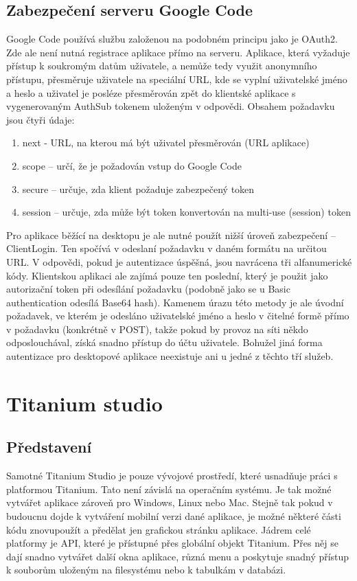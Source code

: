 \subsection{Zabezpečení serveru Google Code}

Google Code používá službu založenou na podobném principu jako je OAuth2. Zde ale není nutná registrace aplikace přímo na serveru. Aplikace, která vyžaduje přístup k soukromým datům uživatele, a nemůže tedy využit anonymního přístupu, přesměruje uživatele na speciální URL, kde se vyplní uživatelské jméno a heslo a uživatel je posléze přesměrován zpět do klientské aplikace s vygenerovaným AuthSub tokenem uloženým v odpovědi. Obsahem požadavku jsou čtyři údaje:

\begin{enumerate}
\item next - URL, na kterou má být uživatel přesměrován (URL aplikace)
\item scope – určí, že je požadován vstup do Google Code
\item secure – určuje, zda klient požaduje zabezpečený token
\item session – určuje, zda může být token konvertován na multi-use (session) token
\end{enumerate}

Pro aplikace běžící na desktopu je ale nutné použít nižší úroveň zabezpečení – ClientLogin. Ten spočívá v odeslaní požadavku v daném formátu na určitou URL. V odpovědi, pokud je autentizace úspěšná, jsou navrácena tři alfanumerické kódy. Klientskou aplikaci ale zajímá pouze ten poslední, který je použit jako autorizační token při odesílání požadavku (podobně jako se u Basic authentication odesílá Base64 hash). Kamenem úrazu této metody je ale úvodní požadavek, ve kterém je odesláno uživatelské jméno a heslo v čitelné formě přímo v požadavku (konkrétně v POST), takže pokud by provoz na síti někdo odposlouchával, získá snadno přístup do účtu uživatele. Bohužel jiná forma autentizace pro desktopové aplikace neexistuje ani u jedné z těchto tří služeb.

\section{Titanium studio}

\subsection{Představení}

Samotné Titanium Studio je pouze vývojové prostředí, které usnadňuje práci s platformou Titanium. Tato není závislá na operačním systému. Je tak možné vytvářet aplikace zároveň pro Windows, Linux nebo Mac. Stejně tak pokud v budoucnu dojde k vytváření mobilní verzi dané aplikace, je možné některé části kódu znovupoužít a předělat jen grafickou stránku aplikace. Jádrem celé platformy je API, které je přístupné přes globální objekt Titanium. Přes něj se dají snadno vytvářet další okna aplikace, různá menu a poskytuje snadný přístup k souborům uloženým na filesystému nebo k tabulkám v databázi. 

